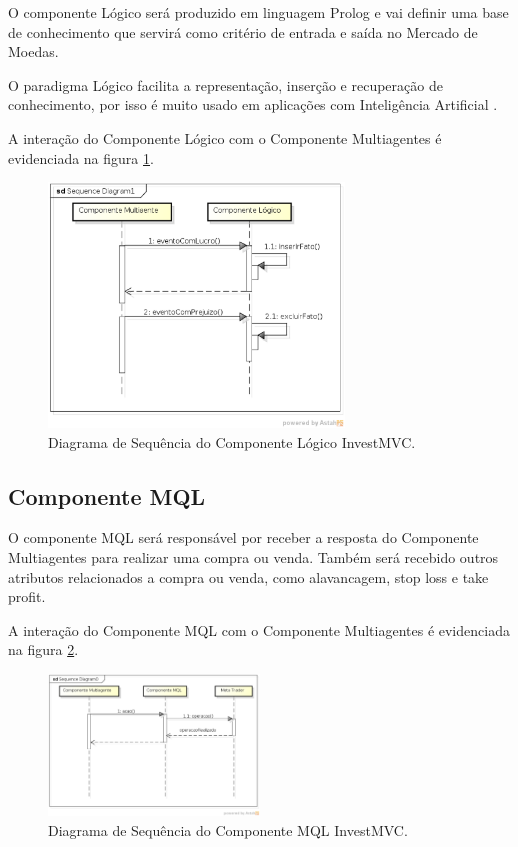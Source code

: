 O componente Lógico será produzido em linguagem Prolog e vai definir uma base de conhecimento que servirá como critério de entrada e saída no Mercado de Moedas.

O paradigma Lógico facilita a representação, inserção e recuperação de conhecimento, por isso é muito usado em aplicações com Inteligência Artificial \cite{almeida2010}.

A interação do Componente Lógico com o Componente Multiagentes é evidenciada na figura \ref{sequenciaLogico}.

\begin{figure}[H]
\centering
\includegraphics[width=0.7\textwidth]{figuras/sequenciaLogico}
\caption{Diagrama de Sequência do Componente Lógico InvestMVC.}
\label{sequenciaLogico}
\end{figure}

\subsection{Componente MQL}

O componente MQL será responsável por receber a resposta do Componente Multiagentes para realizar uma compra ou venda. Também será recebido outros atributos relacionados a compra ou venda, como alavancagem, stop loss e take profit.

A interação do Componente MQL com o Componente Multiagentes é evidenciada na figura \ref{sequenciaMQL}.

\begin{figure}[H]
\centering
\includegraphics[width=0.5\textwidth]{figuras/sequenciaMQL}
\caption{Diagrama de Sequência do Componente MQL InvestMVC.}
\label{sequenciaMQL}
\end{figure}

